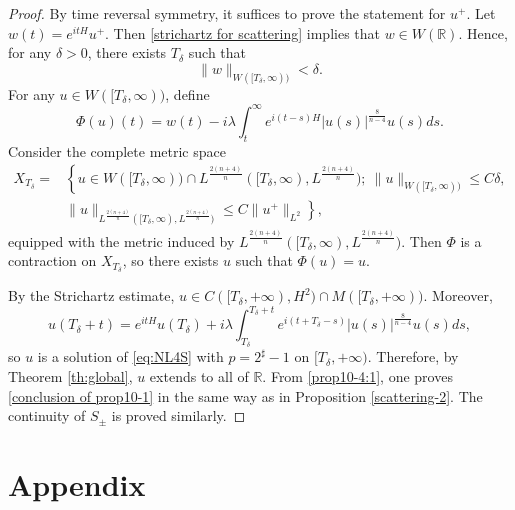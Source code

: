 \documentclass[11pt,a4paper]{article}
\numberwithin{equation}{section}
\begin{document}
\begin{proof}
By time reversal symmetry, it suffices to prove the statement for $u^{+}$.
Let $w(t) = e^{itH}u^{+}$. Then \eqref{strichartz for scattering} implies that $w \in W(\mathbb{R})$.
Hence, for any $\delta > 0$, there exists $T_{\delta}$ such that
\[
\|w\|_{W([T_{\delta}, \infty))} < \delta.
\]
For any $u \in W([T_{\delta}, \infty))$, define
\begin{equation}\label{prop10-4:1}
\Phi (u)(t) = w(t) -i \lambda \int_{t}^{\infty} e^{i(t- s)H}|u(s)|^{\frac{8}{n-4}}u(s) ds.
\end{equation}
Consider the complete metric space
\begin{align*}
X_{T_{\delta}} = &\left\{ u \in W([T_{\delta}, \infty)) \cap L^{\frac{2(n+4)}{n}}([T_{\delta}, \infty), L^{\frac{2(n+4)}{n}}) ; \ \|u\|_{W([T_{\delta}, \infty))} \leq C\delta,\right. \\
&\|u\|_{L^{\frac{2(n+4)}{n}}([T_{\delta}, \infty), L^{\frac{2(n+4)}{n}})}\left. \leq C\|u^{+}\|_{L^{2}}\right\},
\end{align*}
equipped with the metric induced by
$L^{\frac{2(n+4)}{n}}([T_{\delta}, \infty), L^{\frac{2(n+4)}{n}})$.
Then $\Phi$ is a contraction on $X_{T_{\delta}}$, so there exists $u$ such that $\Phi(u)=u$.

By the Strichartz estimate, $u \in C([T_{\delta}, +\infty), H^{2}) \cap M([T_{\delta}, +\infty))$.
Moreover,
\[
 u(T_{\delta} + t) = e^{itH}u(T_{\delta}) + i\lambda\int_{T_{\delta}}^{T_{\delta} + t} e^{i(t + T_{\delta} - s)}|u(s)|^{\frac{8}{n-4}}u(s) ds,
\]
so $u$ is a solution of \eqref{eq:NL4S} with $p = 2^{\sharp} - 1$ on $[T_{\delta}, +\infty)$.
Therefore, by Theorem \ref{th:global}, $u$ extends to all of $\mathbb{R}$.
From \eqref{prop10-4:1}, one proves \eqref{conclusion of prop10-1} in the same way as in Proposition \ref{scattering-2}. The continuity of $S_{\pm}$ is proved similarly.
\end{proof}

\appendix
\section{Appendix}
\end{document}
